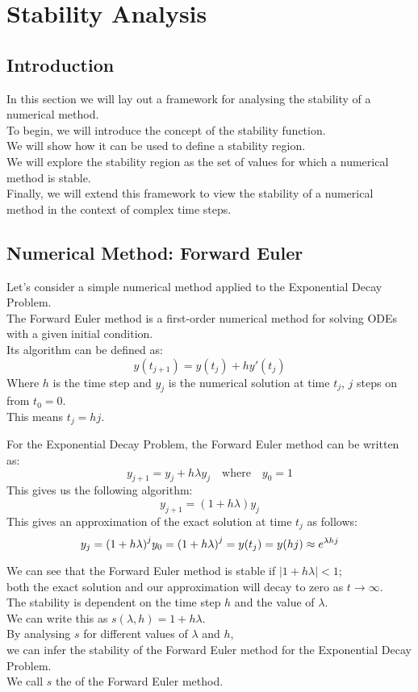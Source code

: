\section{Stability Analysis}

\subsection{Introduction}
\par In this section we will lay out a framework for analysing the stability of a numerical method.\\
To begin, we will introduce the concept of the stability function.\\
We will show how it can be used to define a stability region.\\
We will explore the stability region as the set of values for which a numerical method is stable.\\
Finally, we will extend this framework to view the stability of a numerical method in the context of complex time steps.\\

\subsection{Numerical Method: Forward Euler}

\par Let's consider a simple numerical method applied to the Exponential Decay Problem.\\
The Forward Euler method is a first-order numerical method for solving ODEs with a given initial condition.\\
Its algorithm can be defined as:
\[ y(t_{j+1}) = y(t_j) + h y'(t_j)\]
Where $h$ is the time step and $y_j$ is the numerical solution at time $t_j$, $j$ steps on from $t_0=0$.\\
This means $t_j = hj$.\\

\par For the Exponential Decay Problem, the Forward Euler method can be written as:
\[ y_{j+1} = y_j + h \lambda y_j \quad \text{where} \quad y_0 = 1\]
This gives us the following algorithm:
\[ y_{j+1} = (1 + h \lambda) y_j\]
This gives an approximation of the exact solution at time $t_j$ as follows:
\[ y_{j} = {(1 + h \lambda)}^j y_0 = {(1 + h \lambda)}^j = y(t_j) = y(hj) \approx e^{\lambda h j}\]

\par We can see that the Forward Euler method is stable if $|1 + h \lambda| < 1$;\\
both the exact solution and our approximation will decay to zero as $t \rightarrow \infty$.\\
The stability is dependent on the time step $h$ and the value of $\lambda$.\\
We can write this as $s(\lambda, h) = 1 + h \lambda$.\\
By analysing $s$ for different values of $\lambda$ and $h$,\\
we can infer the stability of the Forward Euler method for the Exponential Decay Problem.\\
We call $s$ the  of the Forward Euler method.

